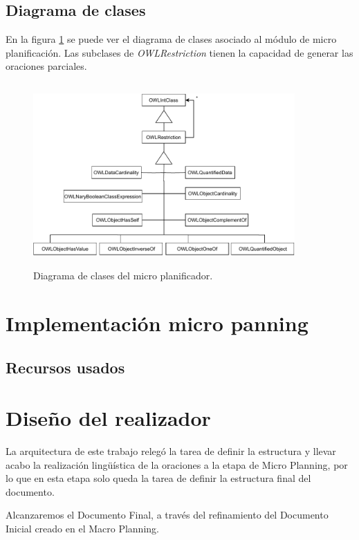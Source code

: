 \subsection{Diagrama de clases}
En la figura \ref{fig:diagrama_clases_microplanificador} se puede ver el diagrama de clases asociado al módulo de micro planificación. Las subclases de \emph{OWLRestriction} tienen la capacidad de generar las oraciones parciales.

\begin{figure}[H]
    \centering
    \includegraphics[width=10cm, height=7cm]{img/generacion_documento/diagrama_clases_microplanificador.pdf}
    \caption{Diagrama de clases del micro planificador.}
    \label{fig:diagrama_clases_microplanificador}
\end{figure}


\section{Implementación micro panning}

\subsection{Recursos usados}

\section{Diseño del realizador}
La arquitectura de este trabajo relegó la tarea de definir la estructura y llevar acabo la realización lingüística de la  oraciones a la etapa de Micro Planning, por lo que en esta etapa solo queda la tarea de definir la estructura final del documento. 

Alcanzaremos el Documento Final, a través del refinamiento del Documento Inicial creado en el Macro Planning.


